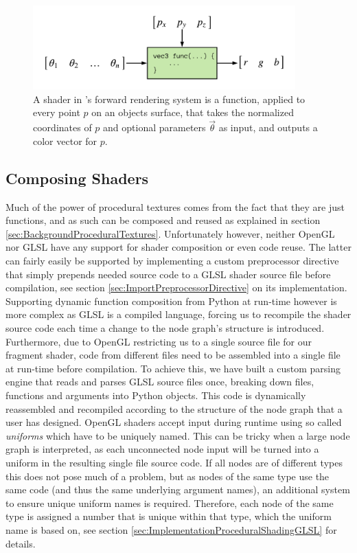 \begin{figure}
    \centering
    \includegraphics[width=0.9\textwidth]{img/method/Shader Diagram.pdf}
    \caption{A shader in \dipter{}'s forward rendering system is a function, applied to every point $p$ on an objects surface, that takes the normalized coordinates of $p$ and optional parameters $\Vec{\theta}$ as input, and outputs a color vector for $p$.}
    \label{fig:OpenGLShader}
\end{figure}


\subsection{Composing Shaders}\label{sec:MethodComposingShaders}

Much of the power of procedural textures comes from the fact that they are just functions, and as such can be composed and reused as explained in section \ref{sec:BackgroundProceduralTextures}. Unfortunately however, neither OpenGL nor GLSL have any support for shader composition or even code reuse. The latter can fairly easily be supported by implementing a custom preprocessor directive that simply prepends needed source code to a GLSL shader source file before compilation, see section \ref{sec:ImportPreprocessorDirective} on its implementation. Supporting dynamic function composition from Python at run-time however is more complex as GLSL is a compiled language, forcing us to recompile the shader source code each time a change to the node graph's structure is introduced. Furthermore, due to OpenGL restricting us to a single source file for our fragment shader, code from different files need to be assembled into a single file at run-time before compilation. To achieve this, we have built a custom parsing engine that reads and parses GLSL source files once, breaking down files, functions and arguments into Python objects. This code is dynamically reassembled and recompiled according to the structure of the node graph that a user has designed. OpenGL shaders accept input during runtime using so called \textit{uniforms} which have to be uniquely named. This can be tricky when a large node graph is interpreted, as each unconnected node input will be turned into a uniform in the resulting single file source code. If all nodes are of different types this does not pose much of a problem, but as nodes of the same type use the same code (and thus the same underlying argument names), an additional system to ensure unique uniform names is required. Therefore, each node of the same type is assigned a number that is unique within that type, which the uniform name is based on, see section \ref{sec:ImplementationProceduralShadingGLSL} for details.


